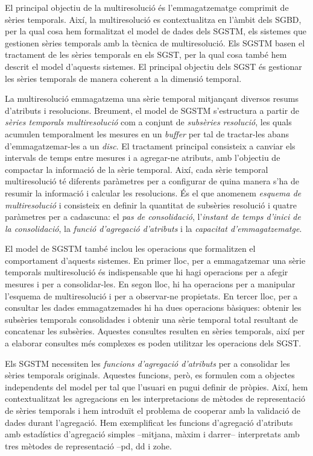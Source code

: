El principal objectiu de la multiresolució és l'emmagatzematge
comprimit de sèries temporals. Així, la multiresolució es
contextualitza en l'àmbit dels \gls{SGBD}, per la qual cosa hem
formalitzat el model de dades dels \gls{SGSTM}, els sistemes que
gestionen sèries temporals amb la tècnica de multiresolució. Els
\gls{SGSTM} basen el tractament de les sèries temporals en els
\gls{SGST}, per la qual cosa també hem descrit el model d'aquests
sistemes. El principal objectiu dels \gls{SGST} és gestionar les
sèries temporals de manera coherent a la dimensió temporal.



La multiresolució emmagatzema una sèrie temporal mitjançant diversos
resums d'atributs i resolucions.  Breument, el model de \gls{SGSTM}
s'estructura a partir de \emph{sèries temporals multiresolució} com a
conjunt de \emph{subsèries resolució}, les quals acumulen temporalment
les mesures en un \emph{buffer} per tal de tractar-les abans
d'emmagatzemar-les a un \emph{disc}. El tractament principal
consisteix a canviar els intervals de temps entre mesures i a
agregar-ne atributs, amb l'objectiu de compactar la informació de la
sèrie temporal.  Així, cada sèrie temporal multiresolució té diferents
paràmetres per a configurar de quina manera s'ha de resumir la
informació i calcular les resolucions. És el que anomenem
\emph{esquema de multiresolució} i consisteix en definir la quantitat
de subsèries resolució i quatre paràmetres per a cadascuna: el
\emph{pas de consolidació}, l'\emph{instant de temps d'inici de la
  consolidació}, la \emph{funció d'agregació d'atributs} i la
\emph{capacitat d'emmagatzematge}.



El model de \gls{SGSTM} també inclou les operacions que formalitzen el
comportament d'aquests sistemes. En primer lloc, per a emmagatzemar
una sèrie temporals multiresolució és indispensable que hi hagi
operacions per a afegir mesures i per a consolidar-les. En segon lloc,
hi ha operacions per a manipular l'esquema de multiresolució i per a
observar-ne propietats. En tercer lloc, per a consultar les dades
emmagatzemades hi ha dues operacions bàsiques: obtenir les subsèries
temporals consolidades i obtenir una sèrie temporal total resultant de
concatenar les subsèries. Aquestes consultes resulten en sèries
temporals, així per a elaborar consultes més complexes es poden
utilitzar les operacions dels \gls{SGST}.



Els \gls{SGSTM} necessiten les \emph{funcions d'agregació d'atributs}
per a consolidar les sèries temporals originals.  Aquestes funcions,
però, es formulen com a objectes independents del model per tal que
l'usuari en pugui definir de pròpies.  Així, hem contextualitzat les
agregacions en les interpretacions de mètodes de representació de
sèries temporals i hem introduït el problema de cooperar amb la
validació de dades durant l'agregació.  Hem exemplificat les funcions
d'agregació d'atributs amb estadístics d'agregació simples --mitjana,
màxim i darrer-- interpretats amb tres mètodes de representació
--\gls{pd}, \gls{dd} i \gls{zohe}.




